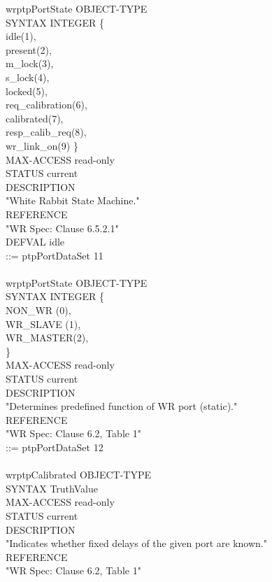 wrptpPortState OBJECT-TYPE \\
SYNTAX INTEGER \{ \\
\tab idle(1), \\
\tab present(2), \\
\tab m\_lock(3), \\
\tab s\_lock(4), \\
\tab locked(5), \\
\tab req\_calibration(6), \\
\tab calibrated(7), \\
\tab resp\_calib\_req(8), \\
\tab wr\_link\_on(9) \} \\
MAX-ACCESS read-only \\
STATUS current \\
DESCRIPTION \\
"White Rabbit State Machine." \\
REFERENCE \\
"WR Spec: Clause 6.5.2.1" \\
DEFVAL { idle } \\
::= { ptpPortDataSet 11 } \\
\\
wrptpPortState OBJECT-TYPE  \\
SYNTAX INTEGER \{ \\
\tab NON\_WR (0), \\
\tab WR\_SLAVE (1), \\ 
\tab WR\_MASTER(2), \\
\} \\
MAX-ACCESS read-only \\ 
STATUS current \\
DESCRIPTION \\
"Determines predefined function of WR port (static)." \\
REFERENCE \\
"WR Spec: Clause 6.2, Table 1" \\
::= { ptpPortDataSet 12 } \\
\\
wrptpCalibrated OBJECT-TYPE \\
SYNTAX TruthValue \\
MAX-ACCESS read-only \\
STATUS current \\
DESCRIPTION \\
"Indicates whether fixed delays of the given port are known." \\
REFERENCE \\
"WR Spec: Clause 6.2, Table 1" \\
